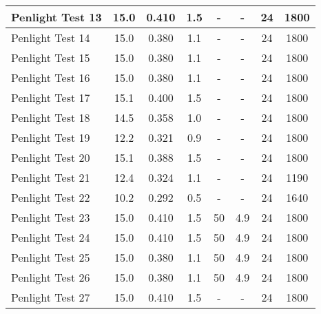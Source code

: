\begin{table}[!ht]
\begin{center}
\begin{tabular}{|l|c|c|c|c|c|c|c|}
Penlight Test 13  &  15.0      &  0.410        &  1.5        &  -         &  -          &  24               &  1800         \\ \hline
Penlight Test 14  &  15.0      &  0.380        &  1.1        &  -         &  -          &  24               &  1800         \\ \hline
Penlight Test 15  &  15.0      &  0.380        &  1.1        &  -         &  -          &  24               &  1800         \\ \hline
Penlight Test 16  &  15.0      &  0.380        &  1.1        &  -         &  -          &  24               &  1800         \\ \hline
Penlight Test 17  &  15.1      &  0.400        &  1.5        &  -         &  -          &  24               &  1800         \\ \hline
Penlight Test 18  &  14.5      &  0.358        &  1.0        &  -         &  -          &  24               &  1800         \\ \hline
Penlight Test 19  &  12.2      &  0.321        &  0.9        &  -         &  -          &  24               &  1800         \\ \hline
Penlight Test 20  &  15.1      &  0.388        &  1.5        &  -         &  -          &  24               &  1800         \\ \hline
Penlight Test 21  &  12.4      &  0.324        &  1.1        &  -         &  -          &  24               &  1190         \\ \hline
Penlight Test 22  &  10.2      &  0.292        &  0.5        &  -         &  -          &  24               &  1640         \\ \hline
Penlight Test 23  &  15.0      &  0.410        &  1.5        &  50        &  4.9        &  24               &  1800         \\ \hline
Penlight Test 24  &  15.0      &  0.410        &  1.5        &  50        &  4.9        &  24               &  1800         \\ \hline
Penlight Test 25  &  15.0      &  0.380        &  1.1        &  50        &  4.9        &  24               &  1800         \\ \hline
Penlight Test 26  &  15.0      &  0.380        &  1.1        &  50        &  4.9        &  24               &  1800         \\ \hline
Penlight Test 27  &  15.0      &  0.410        &  1.5        &  -         &  -          &  24               &  1800         \\ \hline

\end{tabular}
\end{center}
\end{table}
